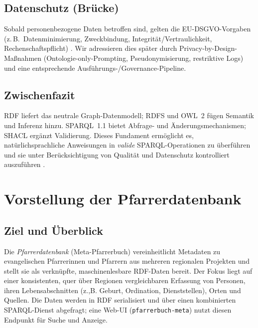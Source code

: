 \subsection{Datenschutz (Brücke)}

Sobald personenbezogene Daten betroffen sind, gelten die EU-DSGVO-Vorgaben (z.\,B.\ Datenminimierung, Zweckbindung, Integrität/Vertraulichkeit, Rechenschaftspflicht) \cite{euGDPR2016}. Wir adressieren dies später durch Privacy-by-Design-Maßnahmen (Ontologie-only-Prompting, Pseudonymisierung, restriktive Logs) und eine entsprechende Ausführungs-/Governance-Pipeline.

\subsection*{Zwischenfazit}

RDF liefert das neutrale Graph-Datenmodell; RDFS und OWL~2 fügen Semantik und Inferenz hinzu. SPARQL~1.1 bietet Abfrage- und Änderungsmechanismen; SHACL ergänzt Validierung. Dieses Fundament ermöglicht es, natürlichsprachliche Anweisungen in \emph{valide} SPARQL-Operationen zu überführen und sie unter Berücksichtigung von Qualität und Datenschutz kontrolliert auszuführen \cite{Hitzler,RDF11Primer,RDFS11,OWL2Overview,SPARQL11Overview,hogan2021,perezGutierrezSparql,SHACL12}.







\section{Vorstellung der Pfarrerdatenbank}
\label{sec:Pfarrerdatenbank}

\subsection{Ziel und Überblick}
Die \emph{Pfarrerdatenbank} (Meta-Pfarrerbuch) vereinheitlicht Metadaten zu evangelischen Pfarrerinnen und Pfarrern aus mehreren regionalen Projekten und stellt sie als verknüpfte, maschinenlesbare RDF-Daten bereit. Der Fokus liegt auf einer konsistenten, quer über Regionen vergleichbaren Erfassung von Personen, ihren Lebensabschnitten (z.,B. Geburt, Ordination, Dienststellen), Orten und Quellen. Die Daten werden in RDF serialisiert und über einen kombinierten SPARQL-Dienst abgefragt; eine Web-UI (\texttt{pfarrerbuch-meta}) nutzt diesen Endpunkt für Suche und Anzeige.

